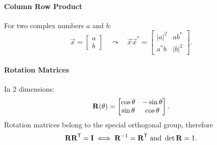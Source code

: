 \paragraph{Column Row Product}

For two complex numbers \(a\) and \(b\):
\[
	\vec{x} =
	\begin{bmatrix}
		a \\ b
	\end{bmatrix}
	\quad
	\leadsto
	\quad
	\vec{x} \vec{x}^* =
	\begin{bmatrix}
		|a|^2 & a b^* \\
		a^* b & |b|^2
	\end{bmatrix}.
\]

\paragraph{Rotation Matrices}

In 2 dimensions:
\[
	\bm{\mathrm{R}}(\theta) =
	\begin{bmatrix}
		\cos \theta & -\sin \theta \\
		\sin \theta & \cos \theta
	\end{bmatrix}
	.
\]
Rotation matrices belong to the special orthogonal group, therefore
\[
	\bm{\mathrm{R}}\bm{\mathrm{R}}^\mathsf{T} = \bm{\mathrm{I}}
	\iff
	\bm{\mathrm{R}}^{-1} = \bm{\mathrm{R}}^\mathsf{T}
	\text{ and }
	\det \bm{\mathrm{R}} = 1.
\]

